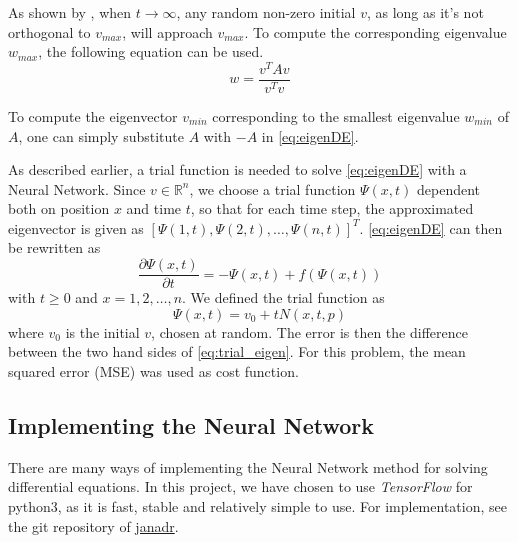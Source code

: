 As shown by \cite{yi2004neural}, when $t\rightarrow \infty$, any random non-zero initial $v$, as long as it's not orthogonal to $v_{max}$, will approach $v_{max}$. To compute the corresponding eigenvalue $w_{max}$, the following equation can be used.
\begin{equation*}\label{eq:find_w}
	w = \frac{v^TAv}{v^Tv}
\end{equation*}

To compute the eigenvector $v_{min}$ corresponding to the smallest eigenvalue $w_{min}$ of $A$, one can simply substitute $A$ with $-A$ in \eqref{eq:eigenDE}.

As described earlier, a trial function is needed to solve \eqref{eq:eigenDE} with a Neural Network. Since $v \in \mathbb{R}^n$, we choose a trial function $\Psi(x,t)$ dependent both on position $x$ and time $t$, so that for each time step, the approximated eigenvector is given as $[\Psi(1,t), \Psi(2,t), \ldots, \Psi(n,t)]^T$. \eqref{eq:eigenDE} can then be rewritten as
\begin{equation}\label{eq:trial_eigen}
	\frac{\partial \Psi(x,t)}{\partial t} = -\Psi(x,t) + f(\Psi(x,t))
\end{equation}
with $t \geq 0$ and $x=1,2,\ldots,n$. We defined the trial function as
\begin{equation*}
	 \Psi(x,t) = v_0 + tN(x,t,p)
\end{equation*}
where $v_0$ is the initial $v$, chosen at random.
The error is then the difference between the two hand sides of \eqref{eq:trial_eigen}. For this problem, the mean squared error (MSE) was used as cost function.

\subsection{Implementing the Neural Network}
There are many ways of implementing the Neural Network method for solving differential equations. In this project, we have chosen to use \textit{TensorFlow} for python3, as it is fast, stable and relatively simple to use. For implementation, see the git repository of \href{https://github.com/janadr/FYS-STK4155/tree/master/project3/code}{janadr}.
